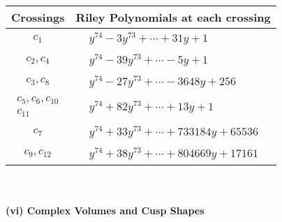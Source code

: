 \documentclass[1p]{elsarticle_modified}
\theoremstyle{definition}
\begin{document}
\begin{tabular}{m{50pt}|m{274pt}}
Crossings & \hspace{64pt}Riley Polynomials at each crossing \\
\hline $$\begin{aligned}c_{1}\end{aligned}$$&$\begin{aligned}
&y^{74}-3 y^{73}+\cdots+31 y+1
\end{aligned}$\\
\hline $$\begin{aligned}c_{2},c_{4}\end{aligned}$$&$\begin{aligned}
&y^{74}-39 y^{73}+\cdots-5 y+1
\end{aligned}$\\
\hline $$\begin{aligned}c_{3},c_{8}\end{aligned}$$&$\begin{aligned}
&y^{74}-27 y^{73}+\cdots-3648 y+256
\end{aligned}$\\
\hline $$\begin{aligned}c_{5},c_{6},c_{10}\\c_{11}\end{aligned}$$&$\begin{aligned}
&y^{74}+82 y^{73}+\cdots+13 y+1
\end{aligned}$\\
\hline $$\begin{aligned}c_{7}\end{aligned}$$&$\begin{aligned}
&y^{74}+33 y^{73}+\cdots+733184 y+65536
\end{aligned}$\\
\hline $$\begin{aligned}c_{9},c_{12}\end{aligned}$$&$\begin{aligned}
&y^{74}+38 y^{73}+\cdots+804669 y+17161
\end{aligned}$\\
\hline
\end{tabular}\\~\\
\newpage\flushleft \textbf{(vi) Complex Volumes and Cusp Shapes}
\end{document}
